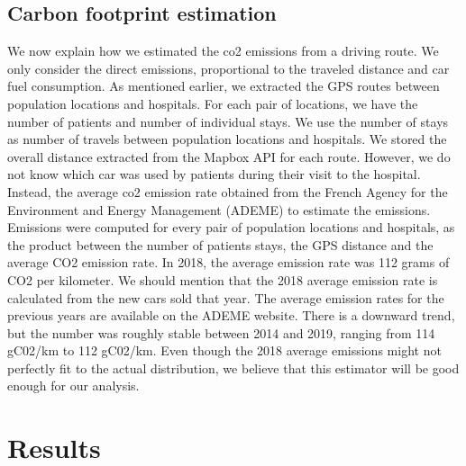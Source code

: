 \subsection{Carbon footprint estimation}

We now explain how we estimated the \ac{co2} emissions from a driving route. We only consider the direct emissions, proportional to the traveled distance and car fuel consumption. As mentioned earlier, we extracted the GPS routes between population locations and hospitals. For each pair of locations, we have the number of patients and number of individual stays. We use the number of stays as number of travels between population locations and hospitals. We stored the overall distance extracted from the Mapbox API for each route. However, we do not know which car was used by patients during their visit to the hospital. Instead, the average \ac{co2} emission rate obtained from the French Agency for the Environment and Energy Management (ADEME) to estimate the emissions. Emissions were computed for every pair of population locations and hospitals, as the product between the number of patients stays, the GPS distance and the average CO2 emission rate. In 2018, the average emission rate was 112 grams of CO2 per kilometer. We should mention that the 2018 average emission rate is calculated from the new cars sold that year. The average emission rates for the previous years are available on the ADEME website. There is a downward trend, but the number was roughly stable between 2014 and 2019, ranging from 114 gC02/km to 112 gC02/km. Even though the 2018 average emissions might not perfectly fit to the actual distribution, we believe that this estimator will be good enough for our analysis.

\section{Results}

